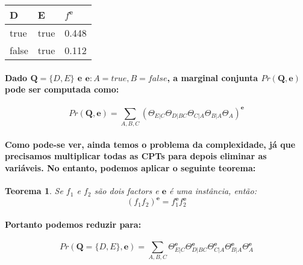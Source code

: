 \documentclass[a4paper,10pt]{article}
\theoremstyle{plain}
\newtheorem*{spn-thm}{Teorema}
\begin{document}
\begin{table}[h]
  \begin{center}
    \begin{tabular}{*{2}{l} | l}
      D & E & $f^\textbf{e}$ \\
      \hline
      true & true & 0.448 \\
      false & true & 0.112 \\
    \end{tabular}
  \end{center}
\end{table}

\paragraph{
  Dado $\textbf{Q} = \{D, E\}$ e $\textbf{e}: A = true, B = false$, a marginal conjunta
  $Pr(\textbf{Q}, \textbf{e})$ pode ser computada como:
}

\begin{equation}
  Pr(\textbf{Q}, \textbf{e}) = \sum_{A, B, C} (\Theta_{E|C} \Theta_{D|BC} \Theta_{C|A} \Theta_{B|A} \Theta_A)^\textbf{e}
\end{equation}

\paragraph{
  Como pode-se ver, ainda temos o problema da complexidade, já que precisamos multiplicar todas as
  CPTs para depois eliminar as variáveis. No entanto, podemos aplicar o seguinte teorema:
}

\begin{spn-thm} Se $f_1$ e $f_2$ são dois factors e $\textbf{e}$ é uma instância, então:
  \begin{equation}
    (f_1f_2)^\textbf{e} = f_1^\textbf{e}f_2^\textbf{e}
  \end{equation}
\end{spn-thm}

\paragraph{
  Portanto podemos reduzir para:
}

\begin{equation}
  Pr(\textbf{Q} = \{D, E\}, \textbf{e}) = \sum_{A, B, C} \Theta_{E|C}^\textbf{e} \Theta_{D|BC}^\textbf{e}
    \Theta_{C|A}^\textbf{e} \Theta_{B|A}^\textbf{e} \Theta_A^\textbf{e}
\end{equation}
\end{document}
